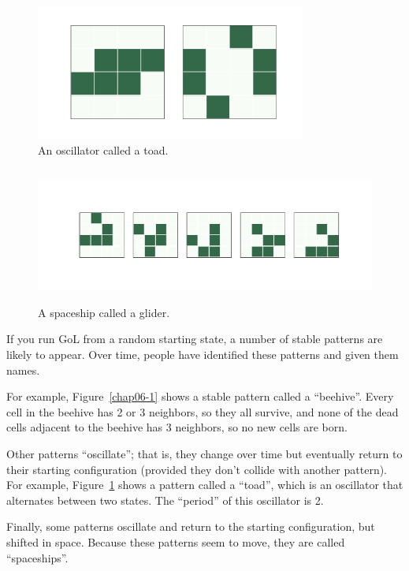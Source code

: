 \documentclass[12pt]{book}
\theoremstyle{exercise}
\begin{document}
\begin{figure}
\centerline{\includegraphics[height=1.75in]{figs/chap06-2.pdf}}
\caption{An oscillator called a toad.}
\label{chap06-2}
\end{figure}

\begin{figure}
\centerline{\includegraphics[height=1.75in]{figs/chap06-3.pdf}}
\caption{A spaceship called a glider.}
\label{chap06-3}
\end{figure}

If you run GoL from a random starting state, a number of stable
patterns are likely to appear.  Over time, people have identified
these patterns and given them names.


For example, Figure~\ref{chap06-1} shows a stable pattern called a
``beehive''.  Every cell in the beehive
has 2 or 3 neighbors, so they all survive, and none of the dead
cells adjacent to the beehive has 3 neighbors, so no new cells
are born.

Other patterns ``oscillate''; that is, they change over time but
eventually return to their starting configuration (provided
they don't collide with another pattern).  For example,
Figure~\ref{chap06-2} shows a pattern called a ``toad'', which
is an oscillator that alternates between two states.  The
``period'' of this oscillator is 2.


Finally, some patterns oscillate and return to the starting
configuration, but shifted in space.  Because these patterns
seem to move, they are called ``spaceships''.
\end{document}
